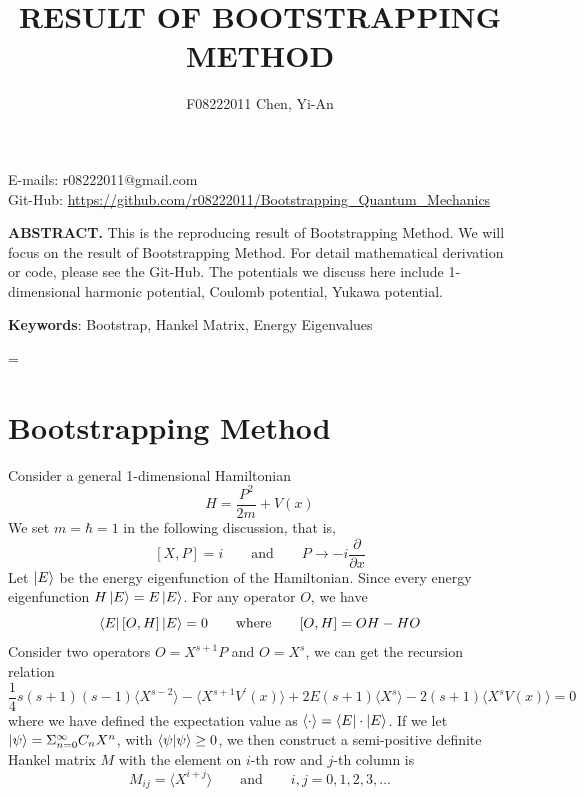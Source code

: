 \documentclass[10pt]{article}
\title{\renewcommand{\baselinestretch}{1.17}\normalsize\bf%
\uppercase{Result of Bootstrapping Method}
}
\author{%
F08222011 Chen, Yi-An
}
\begin{document}
\date{}

\maketitle

\vspace{-0.5cm}

\begin{center}
{\footnotesize 
E-mails: r08222011@gmail.com\\
Git-Hub: \url{https://github.com/r08222011/Bootstrapping_Quantum_Mechanics}
}
\end{center}

\bigskip
\noindent
{\small{\bf ABSTRACT.}
This is the reproducing result of Bootstrapping Method\cite{berenstein2021bootstrapping}. 
We will focus on the result of Bootstrapping Method. For detail mathematical derivation or code, please see the Git-Hub. The potentials we discuss here include 1-dimensional harmonic potential, Coulomb potential, Yukawa potential.
}

\medskip
\noindent
{\small{\bf Keywords}{:} 
Bootstrap, Hankel Matrix, Energy Eigenvalues
}

\baselineskip=\normalbaselineskip

\section{Bootstrapping Method}\label{sec:1}

Consider a general 1-dimensional Hamiltonian
\begin{equation}
    H = \frac{P^2}{2m} + V(x)
\end{equation}
We set $m=\hbar=1$ in the following discussion, that is,
\[[X,P]=i\qquad\text{and}\qquad P\rightarrow -i\frac{\partial}{\partial x}\]
Let $\ket{E}$ be the energy eigenfunction of the Hamiltonian. Since every energy eigenfunction $H\ket{E}=E\ket{E}$. For any operator $O$, we have
\begin{equation}
    \bra{E}[O,H]\ket{E}=0 \qquad\text{where}\qquad [O,H]=OH-HO
\end{equation}
Consider two operators $O=X^{s+1}P$ and $O=X^s$, we can get the recursion relation
\begin{equation}\label{recursion}
    \frac{1}{4}s(s+1)(s-1)\langle X^{s-2}\rangle
    -\langle X^{s+1}V^\prime(x)\rangle
    +2E(s+1)\langle X^s\rangle
    -2(s+1)\langle X^s V(x)\rangle=0
\end{equation}
where we have defined the expectation value as $\langle\cdot\rangle=\bra{E}\cdot\ket{E}$. If we let $\ket{\psi}=\Sigma^{\infty}_{n=0}C_n X^n$, with $\braket{\psi}\geq0$, we then construct a semi-positive definite Hankel matrix $M$ with the element on $i$-th row and $j$-th column is
\begin{equation}
    M_{ij} = \langle X^{i+j} \rangle
    \qquad\text{and}\qquad
    i,j=0,1,2,3,...
\end{equation}
\end{document}
